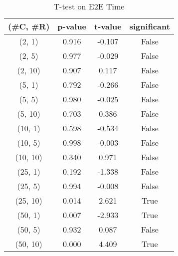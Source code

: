 \begin{table}[h]
\centering
\caption{T-test on E2E Time}
\label{tab:t-testExperiment}
\begin{tabular}{|c|c|c|c|}
\toprule
(\#C, \#R) &  p-value &  t-value &  significant \\
\midrule
  (2, 1) &    0.916 &   -0.107 &        False \\
  (2, 5) &    0.977 &   -0.029 &        False \\
 (2, 10) &    0.907 &    0.117 &        False \\
  (5, 1) &    0.792 &   -0.266 &        False \\
  (5, 5) &    0.980 &   -0.025 &        False \\
 (5, 10) &    0.703 &    0.386 &        False \\
 (10, 1) &    0.598 &   -0.534 &        False \\
 (10, 5) &    0.998 &   -0.003 &        False \\
(10, 10) &    0.340 &    0.971 &        False \\
 (25, 1) &    0.192 &   -1.338 &        False \\
 (25, 5) &    0.994 &   -0.008 &        False \\
(25, 10) &    0.014 &    2.621 &         True \\
 (50, 1) &    0.007 &   -2.933 &         True \\
 (50, 5) &    0.932 &    0.087 &        False \\
(50, 10) &    0.000 &    4.409 &         True \\
\bottomrule
\end{tabular}
\end{table}
